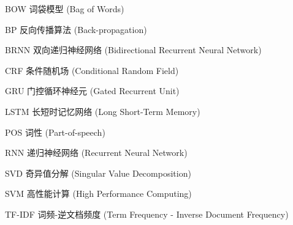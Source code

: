 \begin{denotation}[3cm]

\item[BOW] 词袋模型 (Bag of Words)
\item[BP] 反向传播算法 (Back-propagation)
\item[BRNN] 双向递归神经网络 (Bidirectional Recurrent Neural Network)
\item[CRF] 条件随机场 (Conditional Random Field)
\item[GRU] 门控循环神经元 (Gated Recurrent Unit)
\item[LSTM] 长短时记忆网络 (Long Short-Term Memory)
\item[POS] 词性 (Part-of-speech)
\item[RNN] 递归神经网络 (Recurrent Neural Network)
\item[SVD] 奇异值分解 (Singular Value Decomposition)
\item[SVM] 高性能计算 (High Performance Computing)
\item[TF-IDF] 词频-逆文档频度 (Term Frequency - Inverse Document Frequency)

\end{denotation}

